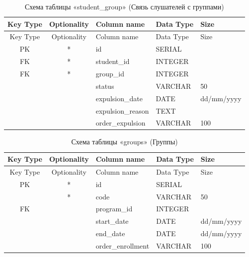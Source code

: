 \begin{xltabular}{\textwidth}{|c|c|l|l|X|}
	\caption{Схема таблицы «student\_group» (Связь слушателей с группами)\label{tab:student_group}}\\ \hline
	\centrow Key Type & \centrow Optionality & \centrow Column name & \centrow Data Type & \centrow Size \\ \hline
	\endfirsthead
	\centrow Key Type & \centrow Optionality & \centrow Column name & \centrow Data Type & \centrow Size \\ \hline
	\finishhead
	PK & * & id & SERIAL & \\ \hline
	FK & * & student\_id & INTEGER & \\ \hline
	FK & * & group\_id & INTEGER & \\ \hline
	& & status & VARCHAR & 50 \\ \hline
	& & expulsion\_date & DATE & dd/mm/yyyy \\ \hline
	& & expulsion\_reason & TEXT & \\ \hline
	& & order\_expulsion & VARCHAR & 100 \\ \hline
\end{xltabular}

\begin{xltabular}{\textwidth}{|c|c|l|l|X|}
	\caption{Схема таблицы «groups» (Группы)\label{tab:groups}}\\ \hline
	\centrow Key Type & \centrow Optionality & \centrow Column name & \centrow Data Type & \centrow Size \\ \hline
	\endfirsthead
	\centrow Key Type & \centrow Optionality & \centrow Column name & \centrow Data Type & \centrow Size \\ \hline
	\finishhead
	PK & * & id & SERIAL & \\ \hline
	& * & code & VARCHAR & 50 \\ \hline
	FK & & program\_id & INTEGER & \\ \hline
	& & start\_date & DATE & dd/mm/yyyy \\ \hline
	& & end\_date & DATE & dd/mm/yyyy \\ \hline
	& & order\_enrollment & VARCHAR & 100 \\ \hline
\end{xltabular}

